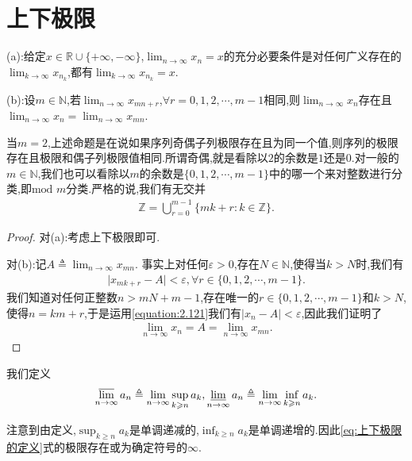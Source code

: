 \documentclass[../../main.tex]{subfiles}
\begin{document}
\section{上下极限}

\begin{proposition}[子列极限命题]\label{proposition:子列极限命题}
(a):给定\(x \in \mathbb{R} \cup \{+\infty, -\infty\}\),\(\lim_{n \to \infty} x_n = x\)的充分必要条件是对任何广义存在的\(\lim_{k \to \infty} x_{n_k}\),都有\(\lim_{k \to \infty} x_{n_k} = x\).

(b):设\(m \in \mathbb{N}\),若\(\lim_{n \to \infty} x_{mn + r}\),\(\forall r = 0,1,2,\cdots,m - 1\)相同,则\(\lim_{n \to \infty} x_n\)存在且
\(\lim_{n \to \infty} x_n = \lim_{n \to \infty} x_{mn}\).
\end{proposition}
\begin{note}
当\(m = 2\),上述命题是在说如果序列奇偶子列极限存在且为同一个值,则序列的极限存在且极限和偶子列极限值相同.所谓奇偶,就是看除以\(2\)的余数是\(1\)还是\(0\).对一般的\(m \in \mathbb{N}\),我们也可以看除以\(m\)的余数是\(\{0,1,2,\cdots,m - 1\}\)中的哪一个来对整数进行分类,即\(\text{mod } m\)分类.严格的说,我们有无交并
\begin{align*}
\mathbb{Z} = \bigcup_{r = 0}^{m - 1} \{mk + r : k \in \mathbb{Z}\}.
\end{align*}
\end{note}
\begin{proof}
对(a):考虑上下极限即可.

对(b):记\(A \triangleq \lim_{n \to \infty} x_{mn}\).
事实上对任何\(\varepsilon > 0\),存在\(N \in \mathbb{N}\),使得当\(k > N\)时,我们有
\begin{align}\label{equation:2.121}
\vert x_{mk + r} - A \vert < \varepsilon, \forall r \in \{0,1,2,\cdots,m - 1\}.
\end{align}
我们知道对任何正整数\(n > mN + m - 1\),存在唯一的\(r \in \{0,1,2,\cdots,m - 1\}\)和\(k > N\),使得\(n = km + r\),于是运用\eqref{equation:2.121}我们有\(\vert x_n - A \vert < \varepsilon\),因此我们证明了
\begin{align*}
\lim_{n \to \infty} x_n = A = \lim_{n \to \infty} x_{mn} .
\end{align*}

\end{proof}

\begin{definition}[上下极限的定义]\label{theorem:上下极限的定义}
我们定义
\begin{align}\label{eq:上下极限的定义}
\varlimsup_{n \to \infty} a_n \triangleq \lim_{n \to \infty} \sup_{k \geqslant  n} a_k, \varliminf_{n \to \infty} a_n \triangleq \lim_{n \to \infty} \inf_{k \geqslant  n} a_k. 
\end{align}
\end{definition}
\begin{note}
注意到由定义,\(\sup_{k \geqslant  n} a_k\)是单调递减的,\(\inf_{k \geqslant  n} a_k\)是单调递增的.因此\eqref{eq:上下极限的定义}式的极限存在或为确定符号的\(\infty\).
\end{note}
\end{document}
